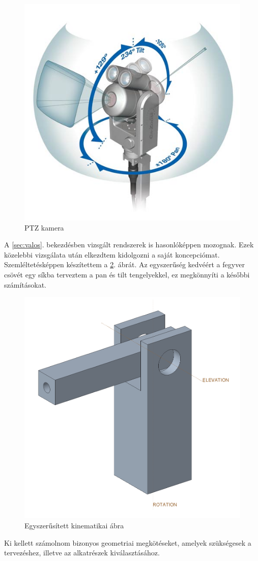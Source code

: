 \documentclass[12pt,a4paper]{article}
\begin{document}
\begin{figure}[h!]
	\centering
	\includegraphics[width=0.6\linewidth]{mech_pantilt}
	\caption{PTZ kamera}
	\label{fig:mech_pantilt}
\end{figure}

A \ref{sec:valos}. bekezdésben vizsgált rendszerek is hasonlóképpen mozognak. Ezek közelebbi vizsgálata után elkezdtem kidolgozni a saját koncepciómat. Szemléltetésképpen készítettem a \ref{fig:megval_mockup}. ábrát. Az egyszerűség kedvéért a fegyver csövét egy síkba terveztem a pan és tilt tengelyekkel, ez megkönnyíti a későbbi számításokat.

\begin{figure}[h!]
	\centering
	\includegraphics[width=0.6\linewidth]{mockup}
	\caption{Egyszerűsített kinematikai ábra}
	\label{fig:megval_mockup}
\end{figure}

Ki kellett számolnom bizonyos geometriai megkötéseket, amelyek szükségesek a tervezéshez, illetve az alkatrészek kiválasztásához. \\
\end{document}
